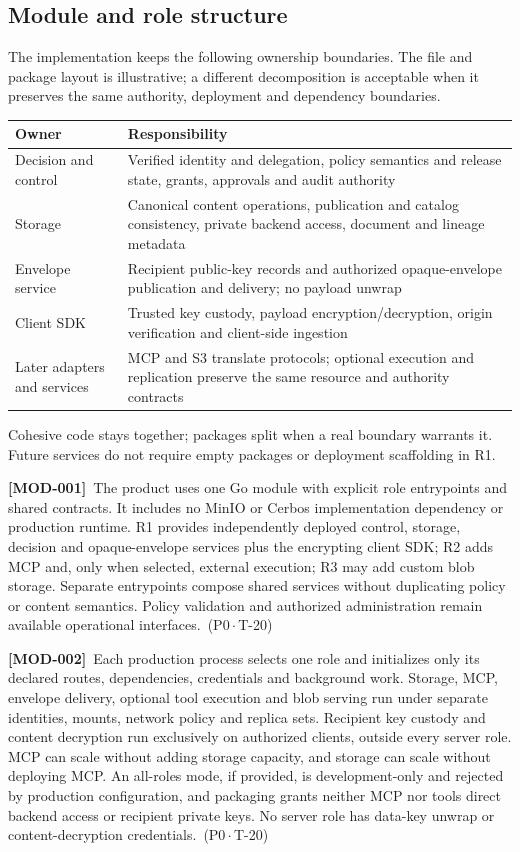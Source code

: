 \documentclass[11pt,a4paper]{article}
\newcommand{\reqtag}[2]{{\footnotesize\color{accent}(#1\,$\cdot$\,#2)}}
\newcommand{\req}[4]{\par\noindent\hypertarget{req:#1}{\textbf{[#1]}}\ #4\ \reqtag{#2}{#3}\par}
\begin{document}
\subsection{Module and role structure}
The implementation keeps the following ownership boundaries. The file and package layout is illustrative; a different decomposition is acceptable when it preserves the same authority, deployment and dependency boundaries.
\begin{longtable}{@{}P{0.24\textwidth}P{0.66\textwidth}@{}}
\toprule Owner & Responsibility\\\midrule\endhead
Decision and control & Verified identity and delegation, policy semantics and release state, grants, approvals and audit authority\\
Storage & Canonical content operations, publication and catalog consistency, private backend access, document and lineage metadata\\
Envelope service & Recipient public-key records and authorized opaque-envelope publication and delivery; no payload unwrap\\
Client SDK & Trusted key custody, payload encryption/decryption, origin verification and client-side ingestion\\
Later adapters and services & MCP and S3 translate protocols; optional execution and replication preserve the same resource and authority contracts\\
\bottomrule
\end{longtable}
Cohesive code stays together; packages split when a real boundary warrants it. Future services do not require empty packages or deployment scaffolding in R1.
\req{MOD-001}{P0}{T-20}{The product uses one Go module with explicit role entrypoints and shared contracts. It includes no MinIO or Cerbos implementation dependency or production runtime. R1 provides independently deployed control, storage, decision and opaque-envelope services plus the encrypting client SDK; R2 adds MCP and, only when selected, external execution; R3 may add custom blob storage. Separate entrypoints compose shared services without duplicating policy or content semantics. Policy validation and authorized administration remain available operational interfaces.}
\req{MOD-002}{P0}{T-20}{Each production process selects one role and initializes only its declared routes, dependencies, credentials and background work. Storage, MCP, envelope delivery, optional tool execution and blob serving run under separate identities, mounts, network policy and replica sets. Recipient key custody and content decryption run exclusively on authorized clients, outside every server role. MCP can scale without adding storage capacity, and storage can scale without deploying MCP. An all-roles mode, if provided, is development-only and rejected by production configuration, and packaging grants neither MCP nor tools direct backend access or recipient private keys. No server role has data-key unwrap or content-decryption credentials.}
\end{document}
